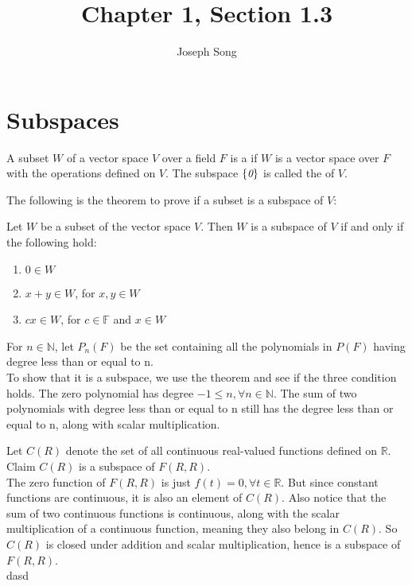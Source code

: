 \documentclass{article}
\title{Chapter 1, Section 1.3}
\author{Joseph Song}
\date{}
\begin{document}
 
 \maketitle
 
 \section{Subspaces}
 
 \begin{definition}[Subspace]
 A subset $W$ of a vector space $V$ over a field $F$ is a  if $W$ is a vector space over $F$ with the operations defined on $V$. The subspace $\{ \emph{0} \}$ is called the  of $V$.
 \end{definition}
 
 The following is the theorem to prove if a subset is a subspace of $V$:
 \begin{theorem}
     Let $W$ be a subset of the vector space $V$. Then $W$ is a subspace of $V$ if and only if the following hold:
 \end{theorem}
 \begin{enumerate}[label=(\arabic*)]
     \item $0 \in W$
     \item $x + y \in W$, for $x, y \in W$
     \item $cx \in W$, for $c \in \mathbb{F}$ and $x \in W$
 \end{enumerate}
 \begin{example}[Polynomials]
 \end{example}
 For $n \in \mathbb{N}$, let $P_n(F)$ be the set containing all the polynomials in $P(F)$ having degree less than or equal to n.
 \\
 To show that it is a subspace, we use the theorem and see if the three condition holds. The zero polynomial has degree $-1 \leq n, \forall n \in \mathbb{N}$.
 The sum of two polynomials with degree less than or equal to n still has the degree less than or equal to n, along with scalar multiplication.
 
 \begin{example}[Functions]
 \end{example}
 
 Let $C(R)$ denote the set of all continuous real-valued functions defined on $\mathbb{R}$. Claim $C(R)$ is a subspace of $F(R, R)$.
 \\
 The zero function of $F(R,R)$ is just $f(t) = 0, \forall t\in \mathbb{R}$. But since constant functions are continuous, it is also an element of $C(R)$. Also notice that the sum of two continuous functions is continuous, along with the scalar multiplication of a continuous function, meaning they also belong in $C(R)$. So $C(R)$ is closed under addition and scalar multiplication, hence is a subspace of $F(R,R)$.
 \\

 dasd
 
 
\end{document}
